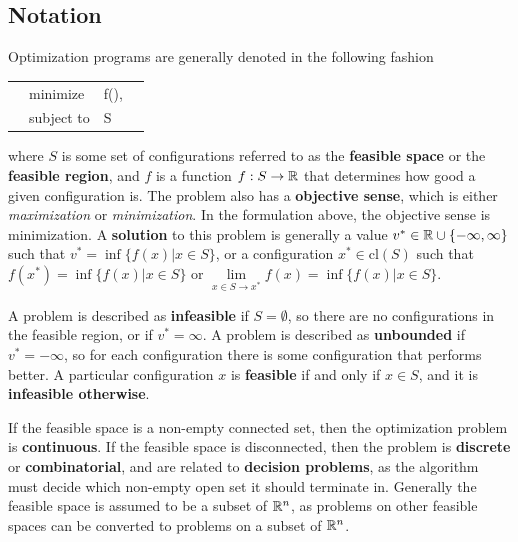 \documentclass[10pt]{article}
\renewcommand{\vec}[1]{\mathbf{#1}}
\newcommand{\R}[1][]{ \ifx&#1& \mathbb{R} \else \mathbb{R}^{#1} \fi }
\newcommand{\x}{\vec{x}}
\begin{document}
\subsection{Notation}
Optimization programs are generally denoted in the following fashion\\
\begin{tabularx}{\textwidth}{X l L X}
	& minimize & f(\x), & \\
	& subject to & \x\in S &
\end{tabularx}
where $S$ is some set of configurations referred to as the \textbf{feasible space} or the \textbf{feasible region}, and $f$ is a function $f:S\to\R$ that determines how good a given configuration is. The problem also has a \textbf{objective sense}, which is either \textit{maximization} or \textit{minimization}. In the formulation above, the objective sense is minimization. A \textbf{solution} to this problem is generally a value $v^*\in\R\cup\{-\infty,\infty\}$ such that $v^* = \inf\{f(x)|x\in S\}$, or a configuration $x^*\in \textrm{cl}(S)$ such that $f(x^*) = \inf \{f(x)|x\in S\}$ or $\lim\limits_{x\in S\rightarrow x^*}f(x) = \inf \{f(x)|x\in S\}$. 

A problem is described as \textbf{infeasible} if $S=\emptyset$, so there are no configurations in the feasible region, or if $v^* = \infty$. A problem is described as \textbf{unbounded} if $v^* = -\infty$, so for each configuration there is some configuration that performs better. A particular configuration $x$ is \textbf{feasible} if and only if $x\in S$, and it is \textbf{infeasible otherwise}.

If the feasible space is a non-empty connected set, then the optimization problem is \textbf{continuous}. If the feasible space is disconnected, then the problem is \textbf{discrete} or \textbf{combinatorial}, and are related to \textbf{decision problems}, as the algorithm must decide which non-empty open set it should terminate in. Generally the feasible space is assumed to be a subset of $\R[n]$, as problems on other feasible spaces can be converted to problems on a subset of $\R[n]$.
\end{document}

